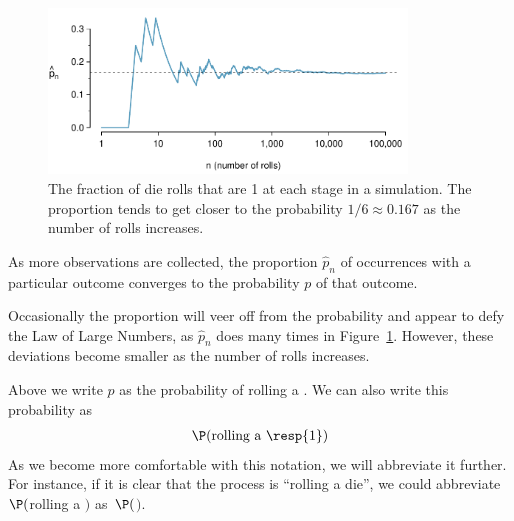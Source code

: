 \begin{figure}%
\centering
\includegraphics[width=0.85\textwidth]{ch_probability/figures/dieProp/dieProp}
\caption{The fraction of die rolls that are 1 at each stage in a simulation. The proportion tends to get closer to the probability $1/6 \approx 0.167$ as the number of rolls increases.}
\label{dieProp}
\end{figure}

\begin{termBox}{
As more observations are collected, the proportion $\hat{p}_n$ of occurrences with a particular outcome converges to the probability $p$ of that outcome.}
\end{termBox}

Occasionally the proportion will veer off from the probability and appear to defy the Law of Large Numbers, as $\hat{p}_n$ does many times in Figure~\ref{dieProp}. However, these deviations become smaller as the number of rolls increases.

Above we write $p$ as the probability of rolling a . We can also write this probability as
\begin{eqnarray*}
\P(\text{rolling a \resp{1}})
\end{eqnarray*}
As we become more comfortable with this notation, we will abbreviate it further. For instance, if it is clear that the process is ``rolling a die'', we could abbreviate $\P($rolling a $)$ as~$\P($$)$. 


